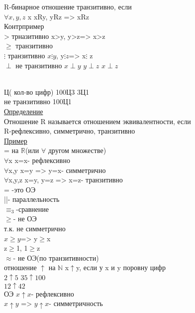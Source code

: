 \documentclass{article}
\begin{document}
R-бинарное отношение транзитивно, если\\
$\forall x,y,z$ x xRy, yRz => xRz\\
Контрпример\\
> трназитивно x>y, y>z=> x>z\\
$\geq$ транзитивно\\
$\vdots$ транзитивно $x\vdots y$, y$\vdots z$=> x$\vdots$ z\\
$\perp$ не транзитивно $x\perp y$ $y \perp z$ \sout{$x \perp z$}\\
\\
Ц( кол-во цифр) 100Ц3 3Ц1\\
не транзитивно 100Ц1\\
\underline{Определение}\\
Отношение R называется отношением эквивалентности, если\\ R-рефлексивно, симметрично, транзитивно\\
\underline{Пример}\\
= на $\mathbb R$(или $\forall$ другом множестве)\\
$\forall$x x=x- рефлексивно\\
$\forall$x,y x=y => y=x- симметрично\\
$\forall$x,y,z x=y, y=z => x=z- транзитивно\\
= -это ОЭ\\
||- параллельность\\
$\equiv_3$-сравнение\\
$\geq$- не ОЭ\\
т.к. не симметрично\\
$x\geq y$=> y$\geq$x\\
z$\geq$1, 1$\geq$z\\
$\approx$- не ОЭ(по транзитивности)\\
отношение $\uparrow$ на $\mathbb N$ x$\uparrow$y, если у x и y поровну цифр\\
$2\uparrow 5$ $35\uparrow 100$ \\
$12\uparrow 42$\\
ОЭ $x\uparrow x$- рефлексивно\\
$x\uparrow y$ => $y\uparrow x$- симметричность\\
\end{document}

